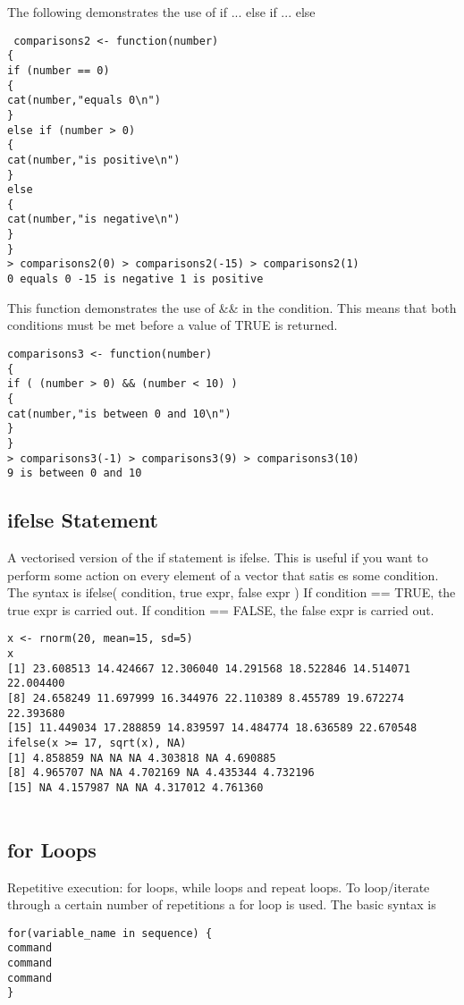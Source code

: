 The following demonstrates the use of
if ... else if ... else
\begin{verbatim}
 comparisons2 <- function(number)
{
if (number == 0)
{
cat(number,"equals 0\n")
}
else if (number > 0)
{
cat(number,"is positive\n")
}
else
{
cat(number,"is negative\n")
}
}
> comparisons2(0) > comparisons2(-15) > comparisons2(1)
0 equals 0 -15 is negative 1 is positive   
\end{verbatim}



This function demonstrates the use of && in the condition. This
means that both conditions must be met before a value of TRUE is
returned.
\begin{verbatim}
comparisons3 <- function(number)
{
if ( (number > 0) && (number < 10) )
{
cat(number,"is between 0 and 10\n")
}
}
> comparisons3(-1) > comparisons3(9) > comparisons3(10)
9 is between 0 and 10    
\end{verbatim}





\subsection*{ifelse Statement}
A vectorised version of the if statement is ifelse. This is useful
if you want to perform some action on every element of a vector
that satis es some condition.
The syntax is
ifelse( condition, true expr, false expr )
If condition == TRUE, the true expr is carried out. If
condition == FALSE, the false expr is carried out.
\begin{framed}
\begin{verbatim}
x <- rnorm(20, mean=15, sd=5)
x
[1] 23.608513 14.424667 12.306040 14.291568 18.522846 14.514071 22.004400
[8] 24.658249 11.697999 16.344976 22.110389 8.455789 19.672274 22.393680
[15] 11.449034 17.288859 14.839597 14.484774 18.636589 22.670548
ifelse(x >= 17, sqrt(x), NA)
[1] 4.858859 NA NA NA 4.303818 NA 4.690885
[8] 4.965707 NA NA 4.702169 NA 4.435344 4.732196
[15] NA 4.157987 NA NA 4.317012 4.761360
    
\end{verbatim}
\end{framed}


\subsection*{for Loops}
Repetitive execution: for loops, while loops and repeat loops.
To loop/iterate through a certain number of repetitions a for loop
is used. The basic syntax is
\begin{verbatim}
for(variable_name in sequence) {
command
command
command
}
\end{verbatim}

